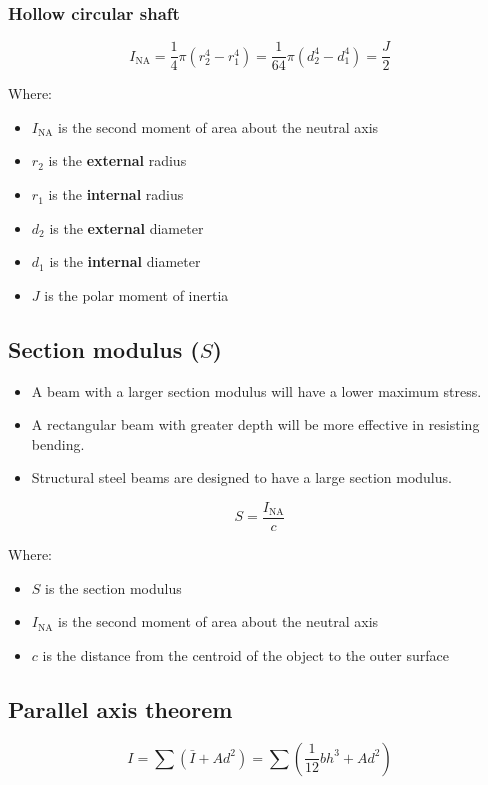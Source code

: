 \documentclass[11pt]{article}
\begin{document}
\subsubsection{Hollow circular shaft}
\label{sec:orgc9d0aee}
\[I_{\text{NA}} = \frac{1}{4}\pi \left(r_2^4 - r_1^4 \right) = \frac{1}{64}\pi \left(d_2^4 - d_1^4 \right) = \frac{J}{2}\]

Where:
\begin{itemize}
\item \(I_{\text{NA}}\) is the second moment of area about the neutral axis
\item \(r_2\) is the \textbf{external} radius
\item \(r_1\) is the \textbf{internal} radius
\item \(d_2\) is the \textbf{external} diameter
\item \(d_1\) is the \textbf{internal} diameter
\item \(J\) is the polar moment of inertia
\end{itemize}

\subsection{Section modulus (\(S\))}
\label{sec:org5ccbf4d}
\begin{itemize}
\item A beam with a larger section modulus will have a lower maximum stress.
\item A rectangular beam with greater depth will be more effective in resisting bending.
\item Structural steel beams are designed to have a large section modulus.
\end{itemize}

\[S = \frac{I_{\text{NA}}}{c}\]

Where:
\begin{itemize}
\item \(S\) is the section modulus
\item \(I_{\text{NA}}\) is the second moment of area about the neutral axis
\item \(c\) is the distance from the centroid of the object to the outer surface
\end{itemize}

\subsection{Parallel axis theorem}
\label{sec:org55aa444}
\[I = \sum \left(\bar{I} + Ad^2 \right) = \sum \left(\frac{1}{12} bh^3 + Ad^2 \right)\]
\end{document}
